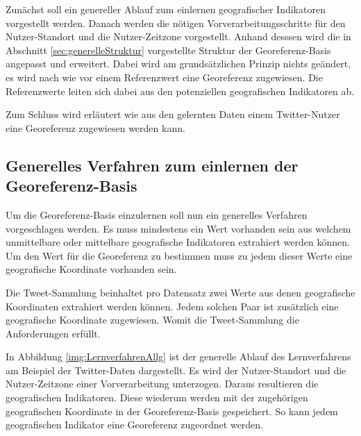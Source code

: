 		Zunächst soll ein genereller Ablauf zum einlernen geografischer Indikatoren vorgestellt werden.
		Danach werden die nötigen Vorverarbeitungsschritte für den Nutzer-Standort und die Nutzer-Zeitzone vorgestellt.
		Anhand desssen wird die in Abschnitt \ref{sec:generelleStruktur} vorgestellte Struktur der Georeferenz-Basis angepasst und erweitert.
		Dabei wird am grundsätzlichen Prinzip nichts geändert, es wird nach wie vor einem Referenzwert eine Georeferenz zugewiesen.
		Die Referenzwerte leiten sich dabei aus den potenziellen geografischen Indikatoren ab.

		Zum Schluss wird erläutert wie aus den gelernten Daten einem Twitter-Nutzer eine Georeferenz zugewiesen werden kann.  


		\subsection{Generelles Verfahren zum einlernen der Georeferenz-Basis}

			Um die Georeferenz-Basis einzulernen soll nun ein generelles Verfahren vorgeschlagen werden.
			Es muss mindestens ein Wert vorhanden sein aus welchem unmittelbare oder mittelbare geografische Indikatoren extrahiert werden können.
			Um den Wert für die Georeferenz zu bestimmen muss zu jedem dieser Werte eine geografische Koordinate vorhanden sein.

			Die Tweet-Sammlung beinhaltet pro Datensatz zwei Werte aus denen geografische Koordinaten extrahiert werden können.
			Jedem solchen Paar ist zusätzlich eine geografische Koordinate zugewiesen.
			Womit die Tweet-Sammlung die Anforderungen erfüllt.

			In Abbildung \ref{img:LernverfahrenAllg} ist der generelle Ablauf des Lernverfahrens am Beispiel der Twitter-Daten dargestellt.
			Es wird der Nutzer-Standort und die Nutzer-Zeitzone einer Vorverarbeitung unterzogen. 
			Daraus resultieren die geografischen Indikatoren.
			Diese wiederum werden mit der zugehörigen geografischen Koordinate in der Georeferenz-Basis gespeichert. 
			So kann jedem geografischen Indikator eine Georeferenz zugeordnet werden.

